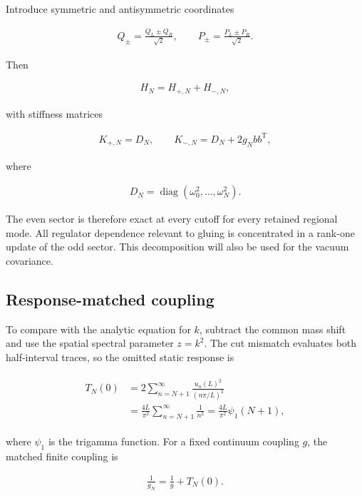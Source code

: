 Introduce symmetric and antisymmetric coordinates

\begin{align}
Q_\pm=\frac{Q_L\pm Q_R}{\sqrt2},
\qquad
P_\pm=\frac{P_L\pm P_R}{\sqrt2}.
\end{align}

Then

\begin{align}
H_N=H_{+,N}+H_{-,N},
\end{align}

with stiffness matrices

\begin{align}
K_{+,N}=D_N,
\qquad
K_{-,N}=D_N+2g_Nbb^{\mathrm T},
\end{align}

where

\begin{align}
D_N=\operatorname{diag}(\omega_0^2,\ldots,\omega_N^2).
\end{align}

The even sector is therefore exact at every cutoff for every retained regional mode. All regulator dependence relevant to gluing is concentrated in a rank-one update of the odd sector. This decomposition will also be used for the vacuum covariance.

\subsection{Response-matched coupling}\label{subsec:interval-response-match}

To compare with the analytic equation for $k$, subtract the common mass shift and use the spatial spectral parameter $z=k^2$. The cut mismatch evaluates both half-interval traces, so the omitted static response is

\begin{align}
\begin{aligned}
T_N(0)
&=2\sum_{n=N+1}^{\infty}
\frac{u_n(L)^2}{(n\pi/L)^2}\\
&=\frac{4L}{\pi^2}\sum_{n=N+1}^{\infty}\frac1{n^2}
=\frac{4L}{\pi^2}\psi_1(N+1),
\end{aligned}
\end{align}

where $\psi_1$ is the trigamma function. For a fixed continuum coupling $g$, the matched finite coupling is

\begin{align}
\frac1{g_N}=\frac1g+T_N(0).
\end{align}

